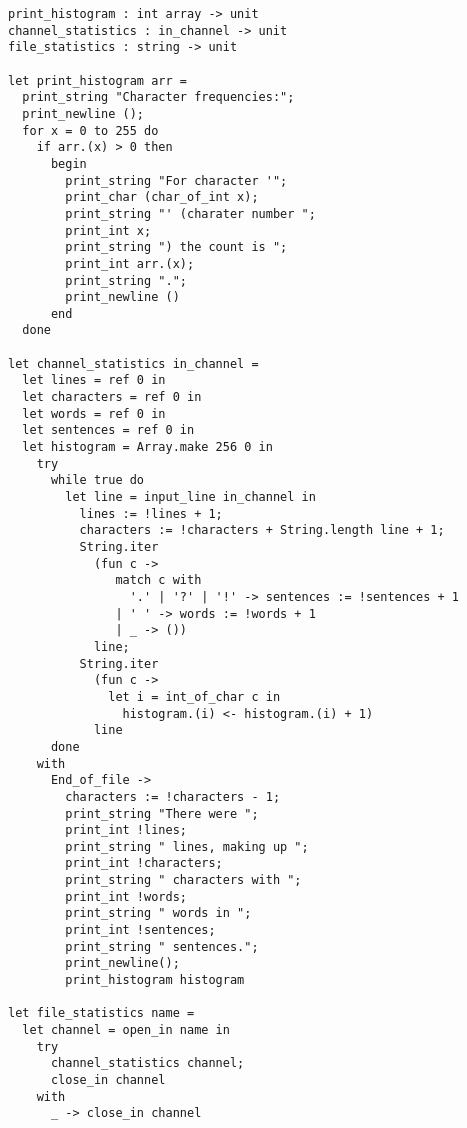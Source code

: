 \documentclass[12pt]{article}
\begin{document}
\begin{lstlisting}
print_histogram : int array -> unit
channel_statistics : in_channel -> unit
file_statistics : string -> unit

let print_histogram arr =
  print_string "Character frequencies:";
  print_newline ();
  for x = 0 to 255 do
    if arr.(x) > 0 then
      begin
        print_string "For character '";
        print_char (char_of_int x);
        print_string "' (charater number ";
        print_int x;
        print_string ") the count is ";
        print_int arr.(x);
        print_string ".";
        print_newline ()
      end
  done

let channel_statistics in_channel =
  let lines = ref 0 in
  let characters = ref 0 in
  let words = ref 0 in
  let sentences = ref 0 in
  let histogram = Array.make 256 0 in
    try
      while true do
        let line = input_line in_channel in
          lines := !lines + 1;
          characters := !characters + String.length line + 1;
          String.iter
            (fun c ->
               match c with
                 '.' | '?' | '!' -> sentences := !sentences + 1
               | ' ' -> words := !words + 1
               | _ -> ())
            line;
          String.iter
            (fun c ->
              let i = int_of_char c in
                histogram.(i) <- histogram.(i) + 1)
            line
      done
    with
      End_of_file ->
        characters := !characters - 1;
        print_string "There were ";
        print_int !lines;
        print_string " lines, making up ";
        print_int !characters;
        print_string " characters with ";
        print_int !words;
        print_string " words in ";
        print_int !sentences;
        print_string " sentences.";
        print_newline();
        print_histogram histogram

let file_statistics name =
  let channel = open_in name in
    try
      channel_statistics channel;
      close_in channel
    with
      _ -> close_in channel
\end{lstlisting}
\end{document}
